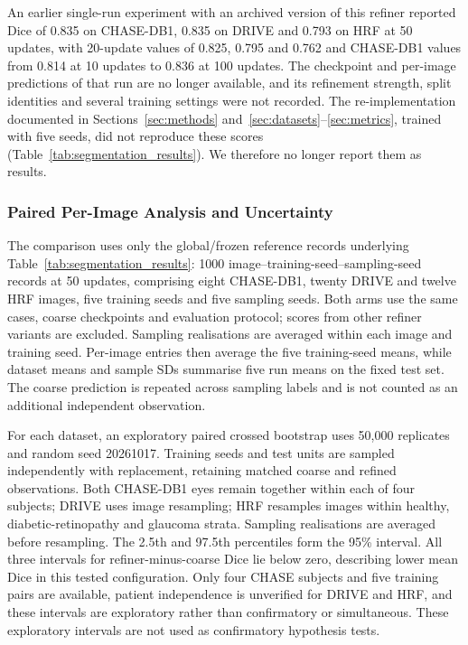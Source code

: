 \documentclass[jimaging,article,submit,pdftex,moreauthors]
  {Definitions/mdpi}
\providecommand{\linelabel}[1]{}
\newcommand{\seclabel}[1]{\linelabel{rev:sec:#1}}
\newcommand{\secend}[1]{\linelabel{rev:end:#1}}
\begin{document}
An earlier single-run experiment with an archived version of this refiner reported Dice of 0.835 on CHASE-DB1, 0.835 on DRIVE and 0.793 on HRF at 50 updates, with 20-update values of 0.825, 0.795 and 0.762 and CHASE-DB1 values from 0.814 at 10 updates to 0.836 at 100 updates. The checkpoint and per-image predictions of that run are no longer available, and its refinement strength, split identities and several training settings were not recorded. The re-implementation documented in Sections~\ref{sec:methods} and~\ref{sec:datasets}--\ref{sec:metrics}, trained with five seeds, did not reproduce these scores (Table~\ref{tab:segmentation_results}). We therefore no longer report them as results.\secend{quantitative}
\subsubsection{Paired Per-Image Analysis and Uncertainty}
\label{sec:paired_per_image}
\seclabel{paired_per_image}
The comparison uses only the global/frozen reference records underlying Table~\ref{tab:segmentation_results}: 1000 image--training-seed--sampling-seed records at 50 updates, comprising eight CHASE-DB1, twenty DRIVE and twelve HRF images, five training seeds and five sampling seeds. Both arms use the same cases, coarse checkpoints and evaluation protocol; scores from other refiner variants are excluded. Sampling realisations are averaged within each image and training seed. Per-image entries then average the five training-seed means, while dataset means and sample SDs summarise five run means on the fixed test set. The coarse prediction is repeated across sampling labels and is not counted as an additional independent observation.

For each dataset, an exploratory paired crossed bootstrap uses 50,000 replicates and random seed 20261017. Training seeds and test units are sampled independently with replacement, retaining matched coarse and refined observations. Both CHASE-DB1 eyes remain together within each of four subjects; DRIVE uses image resampling; HRF resamples images within healthy, diabetic-retinopathy and glaucoma strata. Sampling realisations are averaged before resampling. The 2.5th and 97.5th percentiles form the 95\% interval. All three intervals for refiner-minus-coarse Dice lie below zero, describing lower mean Dice in this tested configuration. Only four CHASE subjects and five training pairs are available, patient independence is unverified for DRIVE and HRF, and these intervals are exploratory rather than confirmatory or simultaneous. These exploratory intervals are not used as confirmatory hypothesis tests.
\end{document}
